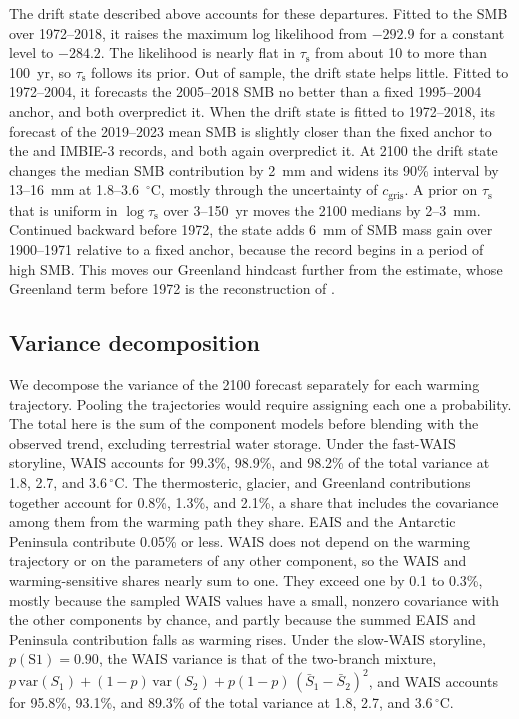 \documentclass[12pt]{article}
\begin{document}
The drift state described above accounts for these departures. Fitted to the \citet{Mouginot2019} SMB over 1972--2018, it raises the maximum log likelihood from $-292.9$ for a constant level to $-284.2$. The likelihood is nearly flat in $\tau_{\mathrm{s}}$ from about 10 to more than 100~yr, so $\tau_{\mathrm{s}}$ follows its prior. Out of sample, the drift state helps little. Fitted to 1972--2004, it forecasts the 2005--2018 SMB no better than a fixed 1995--2004 anchor, and both overpredict it. When the drift state is fitted to 1972--2018, its forecast of the 2019--2023 mean SMB is slightly closer than the fixed anchor to the \citet{Mankoff2021} and IMBIE-3 \citep{Otosaka2026} records, and both again overpredict it. At 2100 the drift state changes the median SMB contribution by 2~mm and widens its 90\% interval by 13--16~mm at 1.8--3.6~$^\circ$C, mostly through the uncertainty of $c_{\mathrm{gris}}$. A prior on $\tau_{\mathrm{s}}$ that is uniform in $\log\tau_{\mathrm{s}}$ over 3--150~yr moves the 2100 medians by 2--3~mm. Continued backward before 1972, the state adds 6~mm of SMB mass gain over 1900--1971 relative to a fixed anchor, because the record begins in a period of high SMB. This moves our Greenland hindcast further from the \citet{Frederikse2020} estimate, whose Greenland term before 1972 is the reconstruction of \citet{Kjeldsen2015}.

\subsection{Variance decomposition}

We decompose the variance of the 2100 forecast separately for each warming trajectory. Pooling the trajectories would require assigning each one a probability. The total here is the sum of the component models before blending with the observed trend, excluding terrestrial water storage. Under the fast-WAIS storyline, WAIS accounts for 99.3\%, 98.9\%, and 98.2\% of the total variance at 1.8, 2.7, and 3.6\,$^\circ$C. The thermosteric, glacier, and Greenland contributions together account for 0.8\%, 1.3\%, and 2.1\%, a share that includes the covariance among them from the warming path they share. EAIS and the Antarctic Peninsula contribute 0.05\% or less. WAIS does not depend on the warming trajectory or on the parameters of any other component, so the WAIS and warming-sensitive shares nearly sum to one. They exceed one by 0.1 to 0.3\%, mostly because the sampled WAIS values have a small, nonzero covariance with the other components by chance, and partly because the summed EAIS and Peninsula contribution falls as warming rises. Under the slow-WAIS storyline, $p(\mathrm{S1}) = 0.90$, the WAIS variance is that of the two-branch mixture, $p\,\mathrm{var}(S_1) + (1-p)\,\mathrm{var}(S_2) + p(1-p)\,(\bar{S}_1 - \bar{S}_2)^2$, and WAIS accounts for 95.8\%, 93.1\%, and 89.3\% of the total variance at 1.8, 2.7, and 3.6\,$^\circ$C.
\end{document}
